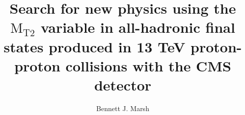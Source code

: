 

\title{
Search for new physics using the $\text{M}_\text{T2}$ variable in all-hadronic final states 
produced in 13 TeV proton-proton collisions with the CMS detector
}

\author{Bennett J. Marsh}

  


